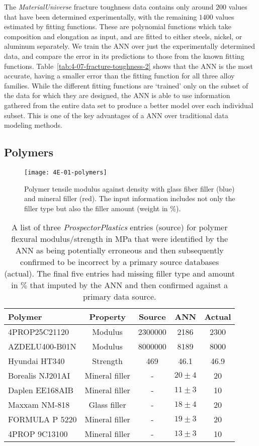 \documentclass[review]{elsarticle}
\newcommand{\tabref}[1]{Table~\ref{#1}}
\begin{document}
The \textit{MaterialUniverse} fracture toughness data contains only around
$200$ values that have been determined experimentally, with the remaining
$1400$ values estimated by fitting functions. These are polynomial functions
which take composition and elongation as input, and are fitted to either
steels, nickel, or aluminum separately. We train the ANN over just the
experimentally determined data, and compare the error in its predictions
to those from the known fitting
functions. \tabref{tab:4-07-fracture-toughness-2} shows that the ANN is the
most accurate, having a smaller error than the fitting function for all
three alloy families. While the different fitting functions are `trained'
only on the subset of the data for which they are designed, the ANN is able
to use information gathered from the entire data set to produce a better
model over each individual subset. This is one of the key advantages of a
ANN over traditional data modeling methods.

\subsection{Polymers}

\begin{figure}
 \centering
 \texttt{[image: 4E-01-polymers]}
 \caption{Polymer tensile modulus against density with glass fiber filler
   (blue) and mineral filler (red). The input information includes not only
   the filler type but also the filler amount (weight in \%).}
 \label{fig:4E-01-polymers}
\end{figure}

\begin{table}
  \caption{A list of three \textit{ProspectorPlastics} entries (source)
    for polymer flexural modulus/strength in \si{\MPa} that were
    identified by the ANN as being potentially erroneous and then
    subsequently confirmed to be incorrect by a  primary source
    databases (actual). The final five entries had missing filler 
    type and amount in $\%$ that imputed by the ANN and then confirmed
    against a primary data source.}
\begin{tabular}{lcccc}
 \bf{Polymer}&
 \bf{Property}&
 \bf{Source}& 
 \bf{ANN}&
 \bf{Actual}\\
 \hline
 4PROP25C21120&Modulus&
 \num{2300000}&\num{2186}&\num{2300}\cite{polyone}\\
 AZDELU400-B01N&Modulus&
 \num{8000000}&\num{8189}&\num{8000}\cite{polyone}\\
 Hyundai HT340&Strength&
 \num{469}&\num{46.1}&\num{46.9}\cite{polyone}\\
 Borealis NJ201AI&Mineral filler&
 -&$20\pm4$&\num{20}\cite{polyone}\\
 Daplen EE168AIB&Mineral filler&
 -&$11\pm3$&\num{10}\cite{polyone}\\
 Maxxam NM-818&Glass filler&
 -&$18\pm4$&\num{20}\cite{polyone}\\
 FORMULA P 5220&Mineral filler&
 -&$19\pm3$&\num{20}\cite{polyone}\\
 4PROP 9C13100&Mineral filler&
 -&$13\pm3$&\num{10}\cite{polyone}
\end{tabular}
  \label{tab:4-09-polymers}
\end{table}
\end{document}
